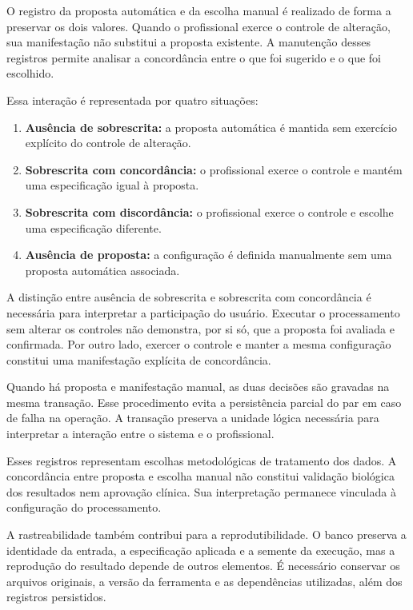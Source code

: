 O registro da proposta automática e da escolha manual é realizado de forma a preservar os dois valores. Quando o profissional exerce o controle de alteração, sua manifestação não substitui a proposta existente. A manutenção desses registros permite analisar a concordância entre o que foi sugerido e o que foi escolhido.

Essa interação é representada por quatro situações:

\begin{enumerate}
    \item \textbf{Ausência de sobrescrita:} a proposta automática é mantida sem exercício explícito do controle de alteração.
    \item \textbf{Sobrescrita com concordância:} o profissional exerce o controle e mantém uma especificação igual à proposta.
    \item \textbf{Sobrescrita com discordância:} o profissional exerce o controle e escolhe uma especificação diferente.
    \item \textbf{Ausência de proposta:} a configuração é definida manualmente sem uma proposta automática associada.
\end{enumerate}

A distinção entre ausência de sobrescrita e sobrescrita com concordância é necessária para interpretar a participação do usuário. Executar o processamento sem alterar os controles não demonstra, por si só, que a proposta foi avaliada e confirmada. Por outro lado, exercer o controle e manter a mesma configuração constitui uma manifestação explícita de concordância.

Quando há proposta e manifestação manual, as duas decisões são gravadas na mesma transação. Esse procedimento evita a persistência parcial do par em caso de falha na operação. A transação preserva a unidade lógica necessária para interpretar a interação entre o sistema e o profissional.

Esses registros representam escolhas metodológicas de tratamento dos dados. A concordância entre proposta e escolha manual não constitui validação biológica dos resultados nem aprovação clínica. Sua interpretação permanece vinculada à configuração do processamento.

A rastreabilidade também contribui para a reprodutibilidade. O banco preserva a identidade da entrada, a especificação aplicada e a semente da execução, mas a reprodução do resultado depende de outros elementos. É necessário conservar os arquivos originais, a versão da ferramenta e as dependências utilizadas, além dos registros persistidos.

